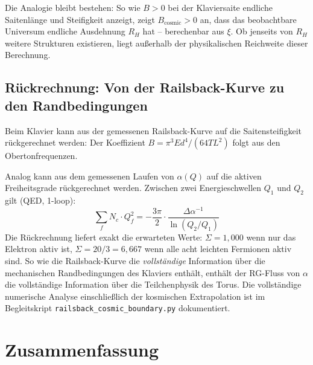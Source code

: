 Die Analogie bleibt bestehen: So wie $B > 0$ bei der Klaviersaite endliche Saitenlänge und Steifigkeit anzeigt, zeigt $B_\text{cosmic} > 0$ an, dass das beobachtbare Universum endliche Ausdehnung $R_H$ hat -- berechenbar aus $\xi$. Ob jenseits von $R_H$ weitere Strukturen existieren, liegt außerhalb der physikalischen Reichweite dieser Berechnung.

\subsection{Rückrechnung: Von der Railsback-Kurve zu den Randbedingungen}

Beim Klavier kann aus der gemessenen Railsback-Kurve auf die Saitensteifigkeit rückgerechnet werden: Der Koeffizient $B = \pi^3 E d^4 / (64 T L^2)$ folgt aus den Obertonfrequenzen.

Analog kann aus dem gemessenen Laufen von $\alpha(Q)$ auf die aktiven Freiheitsgrade rückgerechnet werden. Zwischen zwei Energieschwellen $Q_1$ und $Q_2$ gilt (QED, 1-loop):
\begin{equation}
	\sum_f N_c \cdot Q_f^2 = -\frac{3\pi}{2} \cdot \frac{\Delta\alpha^{-1}}{\ln(Q_2/Q_1)}
\end{equation}
Die Rückrechnung liefert exakt die erwarteten Werte: $\Sigma = 1{,}000$ wenn nur das Elektron aktiv ist, $\Sigma = 20/3 = 6{,}667$ wenn alle acht leichten Fermionen aktiv sind. So wie die Railsback-Kurve die \emph{vollständige} Information über die mechanischen Randbedingungen des Klaviers enthält, enthält der RG-Fluss von $\alpha$ die vollständige Information über die Teilchenphysik des Torus. Die vollständige numerische Analyse einschließlich der kosmischen Extrapolation ist im Begleitskript \texttt{railsback\_cosmic\_boundary.py} dokumentiert.

\section{Zusammenfassung}

